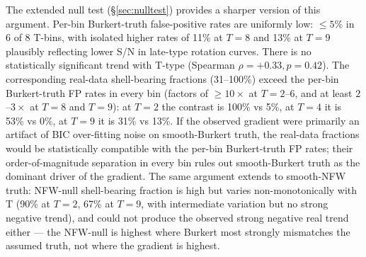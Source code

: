 \documentclass[linenumbers]{aastex701}
\begin{document}
The extended null test (\S\ref{sec:nulltest}) provides a sharper version of this argument. Per-bin Burkert-truth false-positive rates are uniformly low: $\le 5\%$ in 6 of 8 T-bins, with isolated higher rates of 11\% at $T=8$ and 13\% at $T=9$ plausibly reflecting lower S/N in late-type rotation curves. There is no statistically significant trend with T-type (Spearman $\rho = +0.33, p = 0.42$). The corresponding real-data shell-bearing fractions (31--100\%) exceed the per-bin Burkert-truth FP rates in every bin (factors of $\ge 10\times$ at $T=2$--$6$, and at least $2$--$3\times$ at $T=8$ and $T=9$): at $T=2$ the contrast is 100\% vs 5\%, at $T=4$ it is 53\% vs 0\%, at $T=9$ it is 31\% vs 13\%. If the observed gradient were primarily an artifact of BIC over-fitting noise on smooth-Burkert truth, the real-data fractions would be statistically compatible with the per-bin Burkert-truth FP rates; their order-of-magnitude separation in every bin rules out smooth-Burkert truth as the dominant driver of the gradient. The same argument extends to smooth-NFW truth: NFW-null shell-bearing fraction is high but varies non-monotonically with T (90\% at $T=2$, 67\% at $T=9$, with intermediate variation but no strong negative trend), and could not produce the observed strong negative real trend either --- the NFW-null is highest where Burkert most strongly mismatches the assumed truth, not where the gradient is highest.
\end{document}

